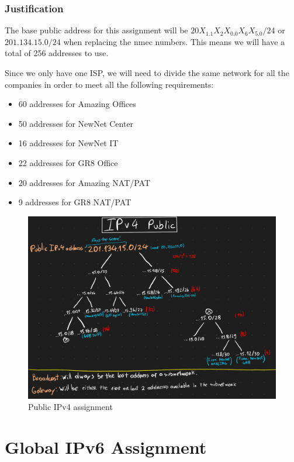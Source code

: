 \documentclass{report}
\begin{document}
\subsection*{Justification}

The base public address for this assignment will be $20X_1.1X_2X_0.0X_6X_5.0/24$ or $201.134.15.0/24$ when replacing the nmec numbers. This means we will have a total of 256 addresses to use.

Since we only have one ISP, we will need to divide the same network for all the companies in order to meet all the following requirements:

\begin{itemize}
    \item 60 addresses for Amazing Offices
    \item 50 addresses for NewNet Center
    \item 16 addresses for NewNet IT
    \item 22 addresses for GR8 Office
    \item 20 addresses for Amazing NAT/PAT
    \item 9 addresses for GR8 NAT/PAT
\end{itemize}

\begin{figure}
    \centering
    \includegraphics[width=\textwidth]{public-ipv4.png}
    \caption{Public IPv4 assignment}
    \label{fig:public-ipv4}
\end{figure}


\chapter*{Global IPv6 Assignment}
\end{document}
